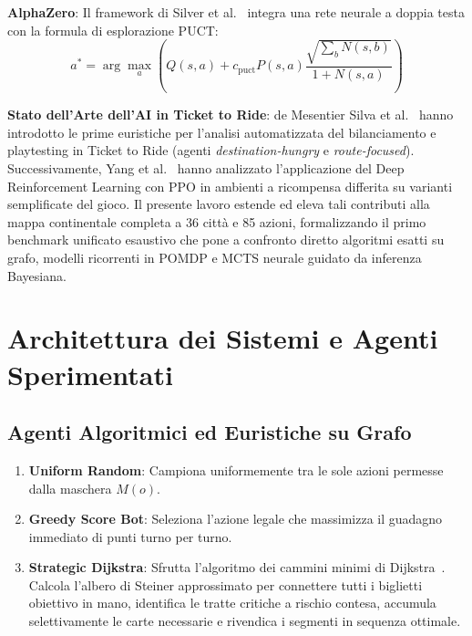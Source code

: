 \documentclass[11pt,a4paper]{article}
\begin{document}
\textbf{AlphaZero}: Il framework di Silver et al.~\cite{silver2017mastering, silver2018general} integra una rete neurale a doppia testa con la formula di esplorazione PUCT:
\begin{equation}
a^* = \arg\max_a \left( Q(s, a) + c_{\text{puct}} P(s, a) \frac{\sqrt{\sum_b N(s, b)}}{1 + N(s, a)} \right)
\end{equation}

\textbf{Stato dell'Arte dell'AI in Ticket to Ride}: de Mesentier Silva et al.~\cite{silva2017playtesting} hanno introdotto le prime euristiche per l'analisi automatizzata del bilanciamento e playtesting in Ticket to Ride (agenti \textit{destination-hungry} e \textit{route-focused}). Successivamente, Yang et al.~\cite{yang2023reinforcement} hanno analizzato l'applicazione del Deep Reinforcement Learning con PPO in ambienti a ricompensa differita su varianti semplificate del gioco. Il presente lavoro estende ed eleva tali contributi alla mappa continentale completa a 36 città e 85 azioni, formalizzando il primo benchmark unificato esaustivo che pone a confronto diretto algoritmi esatti su grafo, modelli ricorrenti in POMDP e MCTS neurale guidato da inferenza Bayesiana.

\section{Architettura dei Sistemi e Agenti Sperimentati}
\label{sec:agenti}

\subsection{Agenti Algoritmici ed Euristiche su Grafo}
\begin{enumerate}
    \item \textbf{Uniform Random}: Campiona uniformemente tra le sole azioni permesse dalla maschera $M(o)$.
    \item \textbf{Greedy Score Bot}: Seleziona l'azione legale che massimizza il guadagno immediato di punti turno per turno.
    \item \textbf{Strategic Dijkstra}: Sfrutta l'algoritmo dei cammini minimi di Dijkstra~\cite{dijkstra1959note}. Calcola l'albero di Steiner approssimato per connettere tutti i biglietti obiettivo in mano, identifica le tratte critiche a rischio contesa, accumula selettivamente le carte necessarie e rivendica i segmenti in sequenza ottimale.
\end{enumerate}
\end{document}
